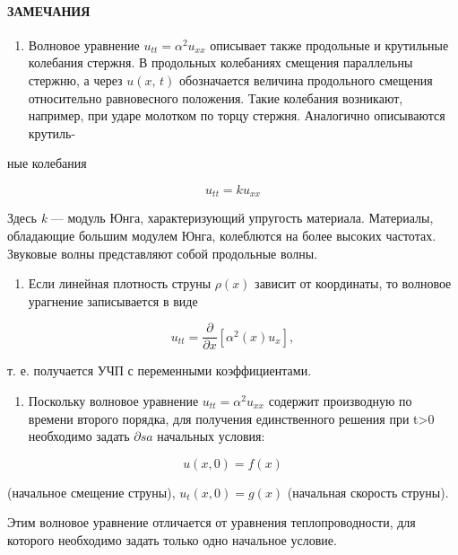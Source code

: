 \documentclass[
  ukrainian,
]{article}
\providecommand{\tightlist}{%
  \setlength{\itemsep}{0pt}\setlength{\parskip}{0pt}}
\begin{document}
\paragraph{ЗАМЕЧАНИЯ}\label{ux437ux430ux43cux435ux447ux430ux43dux438ux44f-1}

\begin{enumerate}
\def\labelenumi{\arabic{enumi}.}
\tightlist
\item
  Волновое уравнение \(u_{tt} = \alpha^2 u_{xx}\) описывает также
  продольные и крутильные колебания стержня. В продольных колебаниях
  смещения параллельны стержню, а через \(u\left(x,\,t\right)\)
  обозначается величина продольного смещения относительно равновесного
  положения. Такие колебания возникают, например, при ударе молотком по
  торцу стержня. Аналогично описываются крутиль-
\end{enumerate}

ные колебания

\[
u_{tt} = ku_{xx}
\]

Здесь \emph{k} --- модуль Юнга, характеризующий упругость материала.
Материалы, обладающие большим модулем Юнга, колеблются на более высоких
частотах. Звуковые волны представляют собой продольные волны.

\begin{enumerate}
\def\labelenumi{\arabic{enumi}.}
\setcounter{enumi}{1}
\tightlist
\item
  Если линейная плотность струны \(\rho(x)\) зависит от координаты, то
  волновое урагнение записывается в виде
\end{enumerate}

\[
u_{tt} = \frac{\partial}{\partial x} [\alpha^2(x) u_x],
\]

т. е. получается УЧП с переменными коэффициентами.

\begin{enumerate}
\def\labelenumi{\arabic{enumi}.}
\setcounter{enumi}{2}
\tightlist
\item
  Поскольку волновое уравнение \(u_{tt} = \alpha^2 u_{xx}\) содержит
  производную по времени второго порядка, для получения единственного
  решения при t\textgreater0 необходимо задать \(\partial sa\) начальных
  условия:
\end{enumerate}

\[
u(x, 0) = f(x)
\]

(начальное смещение струны), \(u_t(x, 0) = g(x)\) (начальная скорость
струны).

Этим волновое уравнение отличается от уравнения теплопроводности, для
которого необходимо задать только одно начальное условие.
\end{document}
